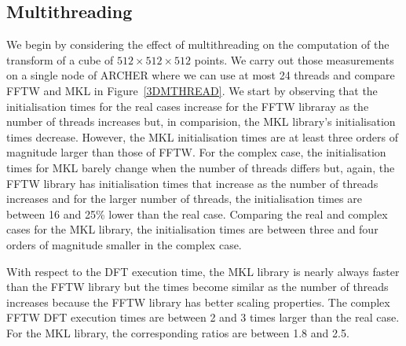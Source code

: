 \documentclass[12pt, a4paper]{article} \setlength{\textheight}{24cm}
\begin{document}
\subsection{Multithreading}\label{MULTITHREADING}
We begin by considering the effect of multithreading on the
computation of the transform of a cube of $512 \times 512 \times 512$
points. We carry out those measurements on a single node of ARCHER
where we can use at most 24 threads and compare FFTW and MKL in
Figure~\ref{3DMTHREAD}. We start by observing that the initialisation
times for the real cases increase for the FFTW libraray as the number
of threads increases but, in comparision, the MKL library's
initialisation times decrease. However, the MKL initialisation times
are at least three orders of magnitude larger than those of FFTW. For
the complex case, the initialisation times for MKL barely change when
the number of threads differs but, again, the FFTW library has
initialisation times that increase as the number of threads increases
and for the larger number of threads, the initialisation times are
between 16 and 25\% lower than the real case. Comparing the real and
complex cases for the MKL library, the initialisation times are
between three and four orders of magnitude smaller in the complex
case.

With respect to the DFT execution time, the MKL library is nearly
always faster than the FFTW library but the times become similar as
the number of threads increases because the FFTW library has better
scaling properties. The complex FFTW DFT execution times are between 2
and 3 times larger than the real case. For the MKL library, the 
corresponding ratios are between 1.8 and 2.5.
\end{document}
